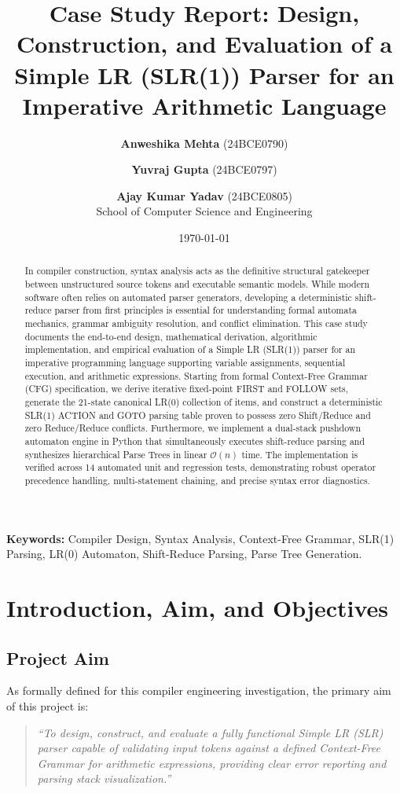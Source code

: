\documentclass[11pt,a4paper]{article}
\title{\Large \textbf{Case Study Report: Design, Construction, and Evaluation of a Simple LR (SLR(1)) Parser for an Imperative Arithmetic Language}}
\author{
    \textbf{Anweshika Mehta} (24BCE0790) \and
    \textbf{Yuvraj Gupta} (24BCE0797) \and
    \textbf{Ajay Kumar Yadav} (24BCE0805) \\[0.3cm]
    \small School of Computer Science and Engineering
}
\date{\today}
\begin{document}
\maketitle

\begin{abstract}
In compiler construction, syntax analysis acts as the definitive structural gatekeeper between unstructured source tokens and executable semantic models. While modern software often relies on automated parser generators, developing a deterministic shift-reduce parser from first principles is essential for understanding formal automata mechanics, grammar ambiguity resolution, and conflict elimination. This case study documents the end-to-end design, mathematical derivation, algorithmic implementation, and empirical evaluation of a Simple LR (SLR(1)) parser for an imperative programming language supporting variable assignments, sequential execution, and arithmetic expressions. Starting from formal Context-Free Grammar (CFG) specification, we derive iterative fixed-point FIRST and FOLLOW sets, generate the 21-state canonical LR(0) collection of items, and construct a deterministic SLR(1) ACTION and GOTO parsing table proven to possess zero Shift/Reduce and zero Reduce/Reduce conflicts. Furthermore, we implement a dual-stack pushdown automaton engine in Python that simultaneously executes shift-reduce parsing and synthesizes hierarchical Parse Trees in linear $\mathcal{O}(n)$ time. The implementation is verified across 14 automated unit and regression tests, demonstrating robust operator precedence handling, multi-statement chaining, and precise syntax error diagnostics.
\end{abstract}

\textbf{Keywords:} Compiler Design, Syntax Analysis, Context-Free Grammar, SLR(1) Parsing, LR(0) Automaton, Shift-Reduce Parsing, Parse Tree Generation.

\newpage
\tableofcontents
\newpage

\section{Introduction, Aim, and Objectives}

\subsection{Project Aim}
As formally defined for this compiler engineering investigation, the primary aim of this project is:
\begin{quote}
\textit{``To design, construct, and evaluate a fully functional Simple LR (SLR) parser capable of validating input tokens against a defined Context-Free Grammar for arithmetic expressions, providing clear error reporting and parsing stack visualization.''}
\end{quote}
\end{document}
